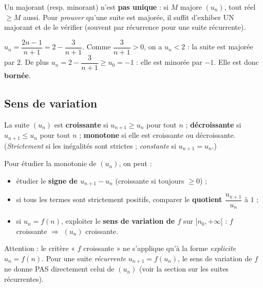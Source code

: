 \begin{remarque}
Un majorant (resp. minorant) n'est \textbf{pas unique} : si $M$ majore $(u_n)$, tout réel $\ge M$ aussi.
Pour \emph{prouver} qu'une suite est majorée, il suffit d'exhiber UN majorant et de le vérifier
(souvent par récurrence pour une suite récurrente).
\end{remarque}

\begin{exemple}
$u_n=\dfrac{2n-1}{n+1}=2-\dfrac3{n+1}$. Comme $\dfrac3{n+1}>0$, on a $u_n<2$ : la suite est
majorée par $2$. De plus $u_n=2-\dfrac3{n+1}\ge u_0=-1$ : elle est minorée par $-1$.
Elle est donc \textbf{bornée}.
\end{exemple}

\subsection{Sens de variation}

\begin{definition}[Monotonie]
La suite $(u_n)$ est \textbf{croissante} si $u_{n+1}\ge u_n$ pour tout $n$ ;
\textbf{décroissante} si $u_{n+1}\le u_n$ pour tout $n$ ; \textbf{monotone} si elle est croissante
ou décroissante. (\emph{Strictement} si les inégalités sont strictes ; \emph{constante} si $u_{n+1}=u_n$.)
\end{definition}

\begin{propriete}
Pour étudier la monotonie de $(u_n)$, on peut :
\begin{itemize}
\item étudier le \textbf{signe de $u_{n+1}-u_n$} (croissante si toujours $\ge0$) ;
\item si tous les termes sont strictement positifs, comparer le \textbf{quotient $\dfrac{u_{n+1}}{u_n}$} à $1$ ;
\item si $u_n=f(n)$, exploiter le \textbf{sens de variation de $f$} sur $[n_0,+\infty[$ :
  $f$ croissante $\Rightarrow$ $(u_n)$ croissante.
\end{itemize}
\end{propriete}

\begin{remarque}
Attention : le critère « $f$ croissante » ne s'applique qu'à la forme \emph{explicite} $u_n=f(n)$.
Pour une suite \emph{récurrente} $u_{n+1}=f(u_n)$, le sens de variation de $f$ ne donne PAS
directement celui de $(u_n)$ (voir la section sur les suites récurrentes).
\end{remarque}

